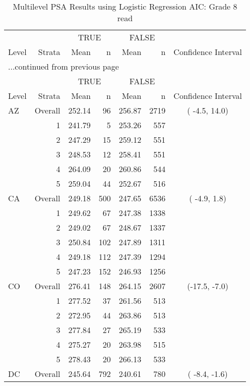 \begin{longtable}{lrrr@{\extracolsep{.25cm}}rrc}
\caption{Multilevel PSA Results using Logistic Regression AIC: Grade 8 read} \\ 
   \hline & & \multicolumn{2}{c}{TRUE} & \multicolumn{2}{c}{FALSE} & \\ \cline{3-4} \cline{5-6} Level & Strata & Mean & n & Mean & n & Confidence Interval \\ \hline\endfirsthead \multicolumn{7}{l}{{...continued from previous page}}\\ \hline  & & \multicolumn{2}{c}{TRUE} & \multicolumn{2}{c}{FALSE} & \\ \cline{3-4} \cline{5-6} Level & Strata & Mean & n & Mean & n & Confidence Interval \\ \hline \endhead \endfoot \endlastfoot  \hline
AZ & Overall & 252.14 &  96 & 256.87 & 2719 & ( -4.5,  14.0) \\ 
   & 1 & 241.79 &   5 & 253.26 & 557 &  \\ 
   & 2 & 247.29 &  15 & 259.12 & 551 &  \\ 
   & 3 & 248.53 &  12 & 258.41 & 551 &  \\ 
   & 4 & 264.09 &  20 & 260.86 & 544 &  \\ 
   & 5 & 259.04 &  44 & 252.67 & 516 &  \\ 
   \hline
CA & Overall & 249.18 & 500 & 247.65 & 6536 & ( -4.9,   1.8) \\ 
   & 1 & 249.62 &  67 & 247.38 & 1338 &  \\ 
   & 2 & 249.02 &  67 & 248.67 & 1337 &  \\ 
   & 3 & 250.84 & 102 & 247.89 & 1311 &  \\ 
   & 4 & 249.18 & 112 & 247.39 & 1294 &  \\ 
   & 5 & 247.23 & 152 & 246.93 & 1256 &  \\ 
   \hline
CO & Overall & 276.41 & 148 & 264.15 & 2607 & (-17.5,  -7.0) \\ 
   & 1 & 277.52 &  37 & 261.56 & 513 &  \\ 
   & 2 & 272.95 &  44 & 263.86 & 513 &  \\ 
   & 3 & 277.84 &  27 & 265.19 & 533 &  \\ 
   & 4 & 275.27 &  20 & 263.98 & 515 &  \\ 
   & 5 & 278.43 &  20 & 266.13 & 533 &  \\ 
   \hline
DC & Overall & 245.64 & 792 & 240.61 & 780 & ( -8.4,  -1.6) \\ 

\end{longtable}
